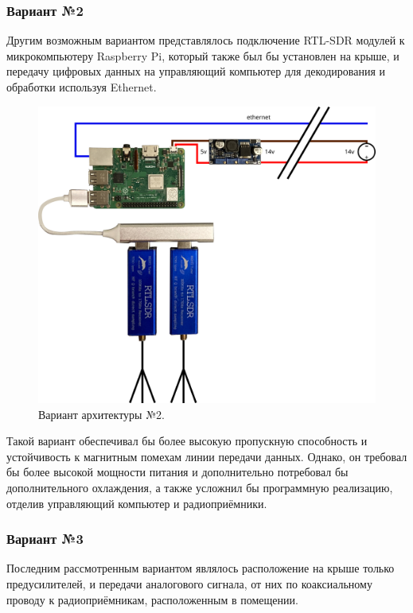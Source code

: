 \documentclass[a4paper, 14pt, titlepage, fleqn]{extarticle}
\begin{document}
	\pagebreak
	\subsubsection*{Вариант №2}
	
	Другим возможным вариантом представлялось подключение RTL-SDR модулей к микрокомпьютеру Raspberry Pi, который также был бы установлен на крыше, и передачу цифровых данных на управляющий компьютер для декодирования и обработки используя Ethernet.
	
	\begin{figure}[H]
		\centering
		\includegraphics[width=\textwidth]{planb.png}
		\caption{Вариант архитектуры №2.}
	\end{figure}
	
	Такой вариант обеспечивал бы более высокую пропускную способность и устойчивость к магнитным помехам линии передачи данных. Однако, он требовал бы более высокой мощности питания и дополнительно потребовал бы дополнительного охлаждения, а также усложнил бы программную реализацию, отделив управляющий компьютер и радиоприёмники.
	
	\pagebreak
	\subsubsection*{Вариант №3}
	
	Последним рассмотренным вариантом являлось расположение на крыше только предусилителей, и передачи аналогового сигнала, от них по коаксиальному проводу к радиоприёмникам, расположенным в помещении.
	
\end{document}
